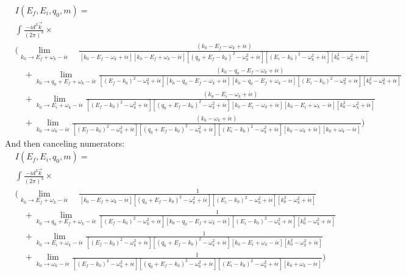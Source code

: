 \begin{align*}
&I(E_f, E_i, q_0, m) = \\
&\int \frac{-i d^3 \vec{k}}{(2\pi)^3} \times\\
&\bigg(\lim_{k_0 \to E_f + \omega_k - i \epsilon}\quad\frac{(k_0 - E_f - \omega_k + i \epsilon)}{
\left[k_0 -E_f - \omega_k + i \epsilon\right] %
\left[k_0 -E_f + \omega_k - i \epsilon\right]
\left[(q_0 + E_f - k_0)^2 - \omega_k^2 + i\epsilon\right]
\left[(E_i - k_0)^2 - \omega_k^2 + i\epsilon\right]
\left[k_0^2 - \omega_k^2 + i\epsilon\right]
} \\
&\quad + \lim_{k_0 \to q_0 + E_f + \omega_k - i \epsilon}\frac{(k_0 - q_0 - E_f - \omega_k + i \epsilon)}{
\left[(E_f - k_0)^2 - \omega_k^2 + i\epsilon\right]
\left[k_0 -q_0 - E_f - \omega_k + i \epsilon\right]%
\left[k_0 -q_0 - E_f + \omega_k - i \epsilon\right]%
\left[(E_i - k_0)^2 - \omega_k^2 + i\epsilon\right]
\left[k_0^2 - \omega_k^2 + i\epsilon\right]
} \\
&\quad + \lim_{k_0 \to E_i + \omega_k - i \epsilon}\frac{(k_0 - E_i - \omega_k + i \epsilon)}{
\left[(E_f - k_0)^2 - \omega_k^2 + i\epsilon\right]
\left[(q_0 + E_f - k_0)^2 - \omega_k^2 + i\epsilon\right]
\left[k_0 - E_i - \omega_k + i \epsilon\right]%
\left[k_0 - E_i + \omega_k - i \epsilon\right]%
\left[k_0^2 - \omega_k^2 + i\epsilon\right]
} \\
&\quad + \lim_{k_0 \to \omega_k - i \epsilon}\frac{(k_0 - \omega_k + i \epsilon)}{
\left[(E_f - k_0)^2 - \omega_k^2 + i\epsilon\right]
\left[(q_0 + E_f - k_0)^2 - \omega_k^2 + i\epsilon\right]
\left[(E_i - k_0)^2 - \omega_k^2 + i\epsilon\right]
\left[k_0 - \omega_k + i \epsilon\right]%
\left[k_0 + \omega_k - i \epsilon\right]%
} \bigg)
\end{align*}
And then canceling numerators: 
\begin{align*}
&I(E_f, E_i, q_0, m) = \\
&\int \frac{-i d^3 \vec{k}}{(2\pi)^3} \times\\
&\bigg(\lim_{k_0 \to E_f + \omega_k - i \epsilon}\quad\frac{1}{
\left[k_0 -E_f + \omega_k - i \epsilon\right]
\left[(q_0 + E_f - k_0)^2 - \omega_k^2 + i\epsilon\right]
\left[(E_i - k_0)^2 - \omega_k^2 + i\epsilon\right]
\left[k_0^2 - \omega_k^2 + i\epsilon\right]
} \\
&\quad + \lim_{k_0 \to q_0 + E_f + \omega_k - i \epsilon}\frac{1}{
\left[(E_f - k_0)^2 - \omega_k^2 + i\epsilon\right]
\left[k_0 -q_0 - E_f + \omega_k - i \epsilon\right]%
\left[(E_i - k_0)^2 - \omega_k^2 + i\epsilon\right]
\left[k_0^2 - \omega_k^2 + i\epsilon\right]
} \\
&\quad + \lim_{k_0 \to E_i + \omega_k - i \epsilon}\frac{1}{
\left[(E_f - k_0)^2 - \omega_k^2 + i\epsilon\right]
\left[(q_0 + E_f - k_0)^2 - \omega_k^2 + i\epsilon\right]
\left[k_0 - E_i + \omega_k - i \epsilon\right]%
\left[k_0^2 - \omega_k^2 + i\epsilon\right]
} \\
&\quad + \lim_{k_0 \to \omega_k - i \epsilon}\frac{1}{
\left[(E_f - k_0)^2 - \omega_k^2 + i\epsilon\right]
\left[(q_0 + E_f - k_0)^2 - \omega_k^2 + i\epsilon\right]
\left[(E_i - k_0)^2 - \omega_k^2 + i\epsilon\right]
\left[k_0 + \omega_k - i \epsilon\right]%
} \bigg)
\end{align*}
